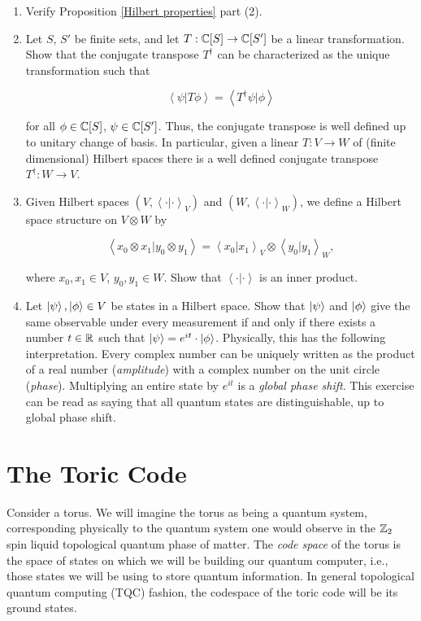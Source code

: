 \documentclass{article}
\theoremstyle{definition}
\numberwithin{figure}{section}
\begin{document}
\begin{enumerate}[\thesection .1.]

\item Verify Proposition \ref{Hilbert properties} part (2).

\item Let $S$, $S'$ be finite sets, and let $T: \mathbb{C}[S]\to \mathbb{C}[S']$ be a linear transformation. Show that the conjugate transpose $T^{\dagger}$ can be characterized as the unique transformation such that

$$\left<\psi | T \phi \right>=\left< T^{\dagger} \psi | \phi \right>$$

for all $\phi\in \mathbb{C}[S]$, $\psi\in \mathbb{C}[S']$. Thus, the conjugate transpose is well defined up to unitary change of basis. In particular, given a linear $T:V\to W$ of (finite dimensional) Hilbert spaces there is a well defined conjugate transpose $T^{\dagger}:W\to V$.

\item Given Hilbert spaces $(V,\left<\cdot|\cdot\right>_V)$ and $(W,\left<\cdot|\cdot\right>_W)$, we define a Hilbert space structure on $V\otimes W$ by

$$\left<x_0\otimes x_1| y_0\otimes y_1\right>=\left<x_0|x_1\right>_{V}\otimes \left<y_0|y_1\right>_W,$$

where $x_0,x_1\in V$, $y_0,y_1\in W$. Show that $\left<\cdot| \cdot\right>$ is an inner product.

\item Let $\left|\psi\right>,\left|\phi\right>\in V$ be states in a Hilbert space. Show that $\left|\psi\right>$ and $\left|\phi\right>$ give the same observable under every measurement if and only if there exists a number $t\in \mathbb{R}$ such that $\left|\psi\right> = e^{i t}\cdot \left|\phi\right>$. Physically, this has the following interpretation. Every complex number can be uniquely written as the product of a real number (\textit{amplitude}) with a complex number on the unit circle (\textit{phase}). Multiplying an entire state by $e^{i t}$ is a \textit{global phase shift}. This exercise can be read as saying that all quantum states are distinguishable, up to global phase shift.
\end{enumerate}

\section{The Toric Code}
\label{The Toric Code}

Consider a torus. We will imagine the torus as being a quantum system, corresponding physically to the quantum system one would observe in the $\mathbb{Z}_2$ spin liquid topological quantum phase of matter. The \textit{code space} of the torus is the space of states on which we will be building our quantum computer, i.e., those states we will be using to store quantum information. In general topological quantum computing (TQC) fashion, the codespace of the toric code will be its ground states.
\end{document}

